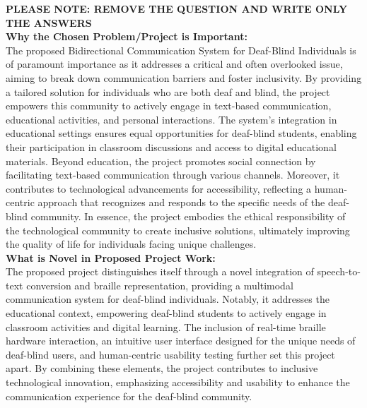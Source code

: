 \documentclass[12pt,a4paper]{report}
\begin{document}
\textbf{PLEASE NOTE: REMOVE THE QUESTION  AND WRITE ONLY THE ANSWERS \\}
\textbf{Why the Chosen Problem/Project is Important:} \\
The proposed Bidirectional Communication System for Deaf-Blind Individuals is of paramount importance as it addresses a critical and often overlooked issue, aiming to break down communication barriers and foster inclusivity. By providing a tailored solution for individuals who are both deaf and blind, the project empowers this community to actively engage in text-based communication, educational activities, and personal interactions. The system's integration in educational settings ensures equal opportunities for deaf-blind students, enabling their participation in classroom discussions and access to digital educational materials. Beyond education, the project promotes social connection by facilitating text-based communication through various channels. Moreover, it contributes to technological advancements for accessibility, reflecting a human-centric approach that recognizes and responds to the specific needs of the deaf-blind community. In essence, the project embodies the ethical responsibility of the technological community to create inclusive solutions, ultimately improving the quality of life for individuals facing unique challenges. \\



\noindent
\textbf{What is Novel in Proposed Project Work:} \\
 The proposed project distinguishes itself through a novel integration of speech-to-text conversion and braille representation, providing a multimodal communication system for deaf-blind individuals. Notably, it addresses the educational context, empowering deaf-blind students to actively engage in classroom activities and digital learning. The inclusion of real-time braille hardware interaction, an intuitive user interface designed for the unique needs of deaf-blind users, and human-centric usability testing further set this project apart. By combining these elements, the project contributes to inclusive technological innovation, emphasizing accessibility and usability to enhance the communication experience for the deaf-blind community. \\
\end{document}
